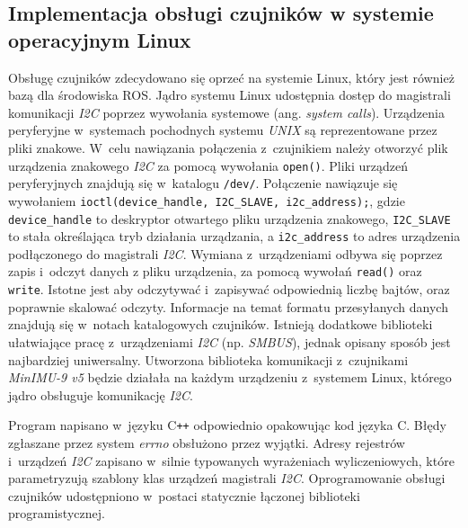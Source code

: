 \subsection{Implementacja obsługi czujników w systemie operacyjnym Linux}
Obsługę czujników zdecydowano się oprzeć na systemie Linux, który jest również
bazą dla środowiska ROS.
Jądro systemu Linux udostępnia dostęp do magistrali komunikacji \textit{I2C}
poprzez wywołania systemowe (ang. \textit{system calls}).
Urządzenia peryferyjne w~systemach pochodnych systemu \textit{UNIX} są
reprezentowane przez pliki znakowe.
W~celu nawiązania połączenia z~czujnikiem należy otworzyć plik urządzenia
znakowego \textit{I2C} za pomocą wywołania \texttt{open()}.
Pliki urządzeń peryferyjnych znajdują się w~katalogu \texttt{/dev/}.
Połączenie nawiązuje się wywołaniem
\texttt{ioctl(device_handle, I2C_SLAVE, i2c_address);}, gdzie
\texttt{device_handle} to deskryptor otwartego pliku urządzenia
znakowego, \texttt{I2C_SLAVE} to stała określająca tryb działania
urządzania, a \texttt{i2c_address} to adres urządzenia podłączonego do
magistrali \textit{I2C}.
Wymiana z~urządzeniami odbywa się poprzez zapis i~odczyt danych z pliku
urządzenia, za pomocą wywołań \texttt{read()} oraz
\texttt{write}.
Istotne jest aby odczytywać i~zapisywać odpowiednią liczbę bajtów, oraz
poprawnie skalować odczyty.
Informacje na temat formatu przesyłanych danych znajdują się w~notach
katalogowych czujników.
Istnieją dodatkowe biblioteki ułatwiające pracę z~urządzeniami \textit{I2C}
(np. \textit{SMBUS}), jednak opisany sposób jest najbardziej uniwersalny.
Utworzona biblioteka komunikacji z~czujnikami \textit{MinIMU-9 v5} będzie
działała na każdym urządzeniu z~systemem Linux, którego jądro obsługuje
komunikację \textit{I2C}.

Program napisano w~języku C\texttt{++} odpowiednio opakowując kod języka C.
Błędy zgłaszane przez system \textit{errno} obsłużono przez wyjątki.
Adresy rejestrów i~urządzeń \textit{I2C} zapisano w~silnie typowanych
wyrażeniach wyliczeniowych, które parametryzują szablony klas urządzeń
magistrali \textit{I2C}.
Oprogramowanie obsługi czujników udostępniono w~postaci statycznie łączonej
biblioteki programistycznej.

